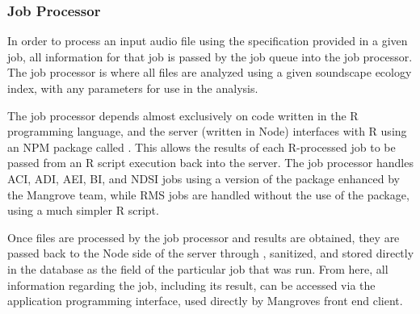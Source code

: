 \subsubsection{Job Processor}
In order to process an input audio file using the specification provided in a given job, all information for that job is passed by the job queue into the job processor. The job processor is where all files are analyzed using a given soundscape ecology index, with any parameters for use in the analysis.\par
The job processor depends almost exclusively on code written in the R programming language, and the server (written in Node) interfaces with R using an NPM package called . This allows the results of each R-processed job to be passed from an R script execution back into the server. The job processor handles ACI, ADI, AEI, BI, and NDSI jobs using a version of the  package enhanced by the Mangrove team, while RMS jobs are handled without the use of the  package, using a much simpler R script.\par
Once files are processed by the job processor and results are obtained, they are passed back to the Node side of the server through , sanitized, and stored directly in the database as the  field of the particular job that was run. From here, all information regarding the job, including its result, can be accessed via the application programming interface, used directly by Mangrove\textquotesingle s front end client.
